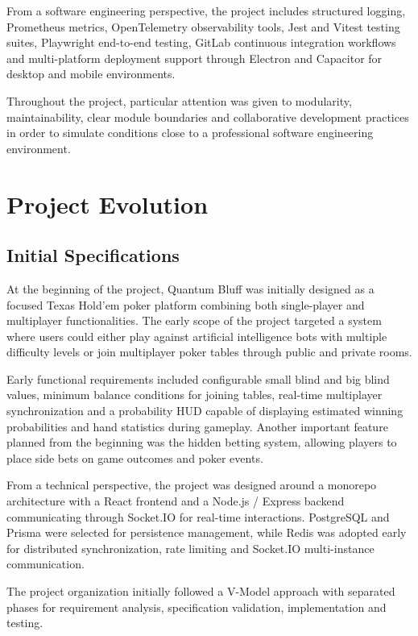 \documentclass[11pt,a4paper]{article}
\begin{document}
From a software engineering perspective, the project includes structured logging, Prometheus metrics, OpenTelemetry observability tools, Jest and Vitest testing suites, Playwright end-to-end testing, GitLab continuous integration workflows and multi-platform deployment support through Electron and Capacitor for desktop and mobile environments.

Throughout the project, particular attention was given to modularity, maintainability, clear module boundaries and collaborative development practices in order to simulate conditions close to a professional software engineering environment.
\newpage
\section{Project Evolution}

\subsection{Initial Specifications}

At the beginning of the project, Quantum Bluff was initially designed as a focused Texas Hold'em poker platform combining both single-player and multiplayer functionalities. The early scope of the project targeted a system where users could either play against artificial intelligence bots with multiple difficulty levels or join multiplayer poker tables through public and private rooms.

Early functional requirements included configurable small blind and big blind values, minimum balance conditions for joining tables, real-time multiplayer synchronization and a probability HUD capable of displaying estimated winning probabilities and hand statistics during gameplay. Another important feature planned from the beginning was the hidden betting system, allowing players to place side bets on game outcomes and poker events.

From a technical perspective, the project was designed around a monorepo architecture with a React frontend and a Node.js / Express backend communicating through Socket.IO for real-time interactions. PostgreSQL and Prisma were selected for persistence management, while Redis was adopted early for distributed synchronization, rate limiting and Socket.IO multi-instance communication.

The project organization initially followed a V-Model approach with separated phases for requirement analysis, specification validation, implementation and testing.
\end{document}
